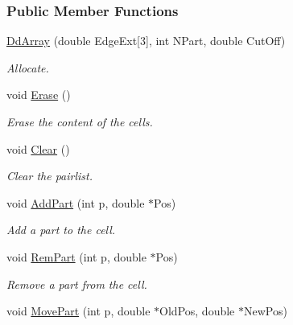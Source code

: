 \subsubsection*{Public Member Functions}
\begin{DoxyCompactItemize}
\item 
\hyperlink{classDdArray_a427b9066964de29a0ecd3d5fe2bedb56}{Dd\+Array} (double Edge\+Ext\mbox{[}3\mbox{]}, int N\+Part, double Cut\+Off)
\begin{DoxyCompactList}\small\item\em Allocate. \end{DoxyCompactList}\item 
void \hyperlink{classDdArray_a98ae2e78109ea826eea71da14c37ce95}{Erase} ()
\begin{DoxyCompactList}\small\item\em Erase the content of the cells. \end{DoxyCompactList}\item 
void \hyperlink{classDdArray_aa71d36872f416feaa853788a7a7a7ef8}{Clear} ()\hypertarget{classDdArray_aa71d36872f416feaa853788a7a7a7ef8}{}\label{classDdArray_aa71d36872f416feaa853788a7a7a7ef8}

\begin{DoxyCompactList}\small\item\em Clear the pairlist. \end{DoxyCompactList}\item 
void \hyperlink{classDdArray_a16bd930c99f12ce47277234de23650ca}{Add\+Part} (int p, double $\ast$Pos)\hypertarget{classDdArray_a16bd930c99f12ce47277234de23650ca}{}\label{classDdArray_a16bd930c99f12ce47277234de23650ca}

\begin{DoxyCompactList}\small\item\em Add a part to the cell. \end{DoxyCompactList}\item 
void \hyperlink{classDdArray_aa81dd095eb9134882b33685338bec68c}{Rem\+Part} (int p, double $\ast$Pos)\hypertarget{classDdArray_aa81dd095eb9134882b33685338bec68c}{}\label{classDdArray_aa81dd095eb9134882b33685338bec68c}

\begin{DoxyCompactList}\small\item\em Remove a part from the cell. \end{DoxyCompactList}\item 
void \hyperlink{classDdArray_a02a69943ed15121906bda20d9c89cb37}{Move\+Part} (int p, double $\ast$Old\+Pos, double $\ast$New\+Pos)\hypertarget{classDdArray_a02a69943ed15121906bda20d9c89cb37}{}\label{classDdArray_a02a69943ed15121906bda20d9c89cb37}


\end{DoxyCompactItemize}
